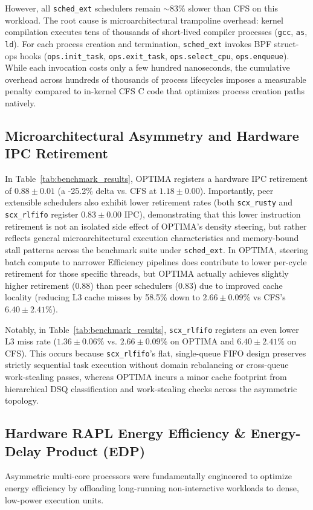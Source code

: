 \documentclass[conference]{IEEEtran}
\begin{document}
However, all \texttt{sched\_ext} schedulers remain $\sim$83\% slower than CFS on this workload. The root cause is microarchitectural trampoline overhead: kernel compilation executes tens of thousands of short-lived compiler processes (\texttt{gcc}, \texttt{as}, \texttt{ld}). For each process creation and termination, \texttt{sched\_ext} invokes BPF struct-ops hooks (\texttt{ops.init\_task}, \texttt{ops.exit\_task}, \texttt{ops.select\_cpu}, \texttt{ops.enqueue}). While each invocation costs only a few hundred nanoseconds, the cumulative overhead across hundreds of thousands of process lifecycles imposes a measurable penalty compared to in-kernel CFS C code that optimizes process creation paths natively.

\subsection{Microarchitectural Asymmetry and Hardware IPC Retirement}
In Table~\ref{tab:benchmark_results}, OPTIMA registers a hardware IPC retirement of $0.88 \pm 0.01$ (a -25.2\% delta vs. CFS at $1.18 \pm 0.00$). Importantly, peer extensible schedulers also exhibit lower retirement rates (both \texttt{scx\_rusty} and \texttt{scx\_rlfifo} register $0.83 \pm 0.00$ IPC), demonstrating that this lower instruction retirement is not an isolated side effect of OPTIMA's density steering, but rather reflects general microarchitectural execution characteristics and memory-bound stall patterns across the benchmark suite under \texttt{sched\_ext}. In OPTIMA, steering batch compute to narrower Efficiency pipelines does contribute to lower per-cycle retirement for those specific threads, but OPTIMA actually achieves slightly higher retirement ($0.88$) than peer schedulers ($0.83$) due to improved cache locality (reducing L3 cache misses by 58.5\% down to $2.66 \pm 0.09\%$ vs CFS's $6.40 \pm 2.41\%$).

Notably, in Table~\ref{tab:benchmark_results}, \texttt{scx\_rlfifo} registers an even lower L3 miss rate ($1.36 \pm 0.06\%$ vs. $2.66 \pm 0.09\%$ on OPTIMA and $6.40 \pm 2.41\%$ on CFS). This occurs because \texttt{scx\_rlfifo}'s flat, single-queue FIFO design preserves strictly sequential task execution without domain rebalancing or cross-queue work-stealing passes, whereas OPTIMA incurs a minor cache footprint from hierarchical DSQ classification and work-stealing checks across the asymmetric topology.

\subsection{Hardware RAPL Energy Efficiency \& Energy-Delay Product (EDP)}
\label{sec:rapl_analysis}
Asymmetric multi-core processors were fundamentally engineered to optimize energy efficiency by offloading long-running non-interactive workloads to dense, low-power execution units.
\end{document}
